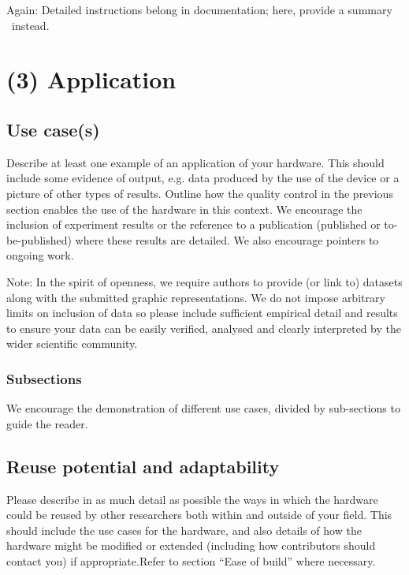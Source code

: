 \documentclass[a4paper]{article}
\begin{document}
Again: Detailed instructions belong in documentation; here, provide a
summary ~instead.


\section{(3) Application}\label{h.f78bi3oom0mu}

\subsection{Use case(s)}\label{h.4q5g9edishy3}

Describe at least one example of an application of your hardware. This
should include some evidence of output, e.g. data produced by the use of
the device or a picture of other types of results. Outline how the
quality control in the previous section enables the use of the hardware
in this context. We encourage the inclusion of experiment results or the
reference to a publication (published or to-be-published) where these
results are detailed. We also encourage pointers to ongoing work.

Note: In the spirit of openness, we require authors to provide (or link
to) datasets along with the submitted graphic representations. We do not
impose arbitrary limits on inclusion of data so please include
sufficient empirical detail and results to ensure your data can be
easily verified, analysed and clearly interpreted by the wider
scientific community.


\subsubsection{Subsections}\label{h.qz4dez1pbkv1}

We encourage the demonstration of different use cases, divided by
sub-sections to guide the reader.


\subsection{Reuse potential and adaptability}\label{h.6wkumyl0ejrh}

Please describe in as much detail as possible the ways in which the
hardware could be reused by other researchers both within and outside of
your field. This should include the use cases for the hardware, and also
details of how the hardware might be modified or extended (including how
contributors should contact you) if appropriate.Refer to section
``Ease of build'' where necessary.
\end{document}
